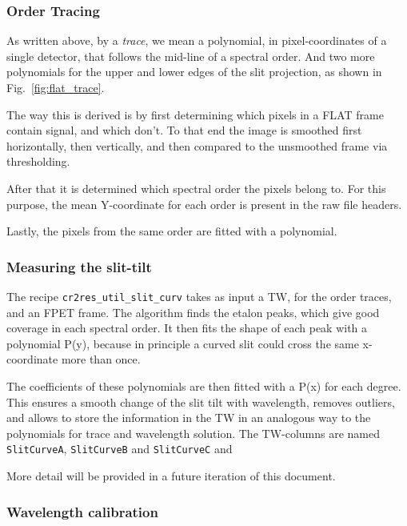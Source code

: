 \subsubsection{Order Tracing}
\label{sec:ordertrace}

As written above, by a \emph{trace}, we mean a polynomial, in pixel-coordinates of a single detector, that follows the mid-line of a spectral order. And two more polynomials for the upper and lower edges of the slit projection, as shown in Fig.~\ref{fig:flat_trace}.

The way this is derived is by first determining which pixels in a FLAT frame contain signal, and which don't. To that end the image is smoothed first horizontally, then vertically, and then compared to the unsmoothed frame via thresholding.

After that it is determined which spectral order the pixels belong to. For this purpose, the mean Y-coordinate for each order is present in the raw file headers.

Lastly, the pixels from the same order are fitted with a polynomial.


\subsubsection{Measuring the slit-tilt}
\label{sec:tilt}

The recipe \verb!cr2res_util_slit_curv! takes as input a TW, for the order
traces, and an FPET frame. The algorithm finds the etalon peaks, which give good
coverage in each spectral order. It then fits the shape of each peak with a
polynomial P(y), because in principle a curved slit could cross the same
x-coordinate more than once.

The coefficients of these polynomials are then fitted with a P(x) for each
degree. This ensures a smooth change of the slit tilt with wavelength, removes
outliers, and allows to store the information in the TW in an analogous way to
the polynomials for trace and wavelength solution. The TW-columns are named \verb!SlitCurveA!, \verb!SlitCurveB! and \verb!SlitCurveC! and 

More detail will be provided in a future iteration of this document.

\subsubsection{Wavelength calibration}

